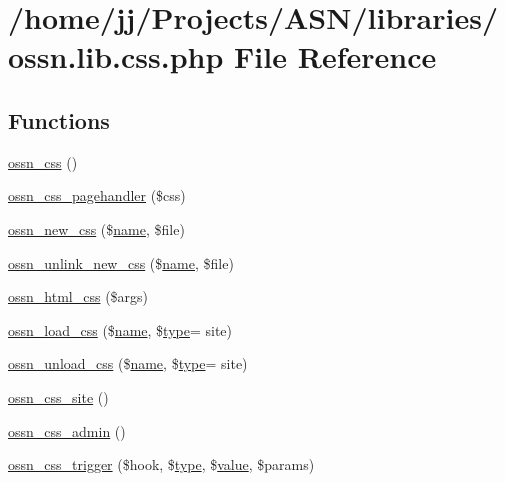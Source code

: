 \hypertarget{ossn_8lib_8css_8php}{}\section{/home/jj/\+Projects/\+A\+S\+N/libraries/ossn.lib.\+css.\+php File Reference}
\label{ossn_8lib_8css_8php}
\subsection*{Functions}
\begin{DoxyCompactItemize}
\item 
\hyperlink{ossn_8lib_8css_8php_a195a6eb38b26afa6bab2d6b157b51f36}{ossn\+\_\+css} ()
\item 
\hyperlink{ossn_8lib_8css_8php_ad02d0f40db00d32c427768bb1c4ff023}{ossn\+\_\+css\+\_\+pagehandler} (\$css)
\item 
\hyperlink{ossn_8lib_8css_8php_a299928a19304b4132b5eec1e3c32c83f}{ossn\+\_\+new\+\_\+css} (\$\hyperlink{user_8php_a765af5e9671743530143a6d3670fd9a6}{name}, \$file)
\item 
\hyperlink{ossn_8lib_8css_8php_a8259150ec8a3563f9a44174255f25a74}{ossn\+\_\+unlink\+\_\+new\+\_\+css} (\$\hyperlink{user_8php_a765af5e9671743530143a6d3670fd9a6}{name}, \$file)
\item 
\hyperlink{ossn_8lib_8css_8php_a864e0941c325bfc0eb9dba06e2109776}{ossn\+\_\+html\+\_\+css} (\$args)
\item 
\hyperlink{ossn_8lib_8css_8php_a90a910abb90e4020c59e9c4eca8c0fd5}{ossn\+\_\+load\+\_\+css} (\$\hyperlink{user_8php_a765af5e9671743530143a6d3670fd9a6}{name}, \$\hyperlink{_ossn_wall_2actions_2wall_2post_2group_8php_a2dc1bb4e1ed0029daa81ac0776b14b51}{type}= \textquotesingle{}site\textquotesingle{})
\item 
\hyperlink{ossn_8lib_8css_8php_a5a5e5eb85b1e4f92c89582bac236a782}{ossn\+\_\+unload\+\_\+css} (\$\hyperlink{user_8php_a765af5e9671743530143a6d3670fd9a6}{name}, \$\hyperlink{_ossn_wall_2actions_2wall_2post_2group_8php_a2dc1bb4e1ed0029daa81ac0776b14b51}{type}= \textquotesingle{}site\textquotesingle{})
\item 
\hyperlink{ossn_8lib_8css_8php_ab1a5a25e3a071a3a6647a792c90f4482}{ossn\+\_\+css\+\_\+site} ()
\item 
\hyperlink{ossn_8lib_8css_8php_a47bae94f3fed216a9a6ad37fcf0e97c7}{ossn\+\_\+css\+\_\+admin} ()
\item 
\hyperlink{ossn_8lib_8css_8php_a096951f4fb8773a428bc04f6bcc069bf}{ossn\+\_\+css\+\_\+trigger} (\$hook, \$\hyperlink{_ossn_wall_2actions_2wall_2post_2group_8php_a2dc1bb4e1ed0029daa81ac0776b14b51}{type}, \$\hyperlink{fullpage_2plugin_8min_8js_ac56c57897e10f699d124e0103921aa20}{value}, \$params)

\end{DoxyCompactItemize}

